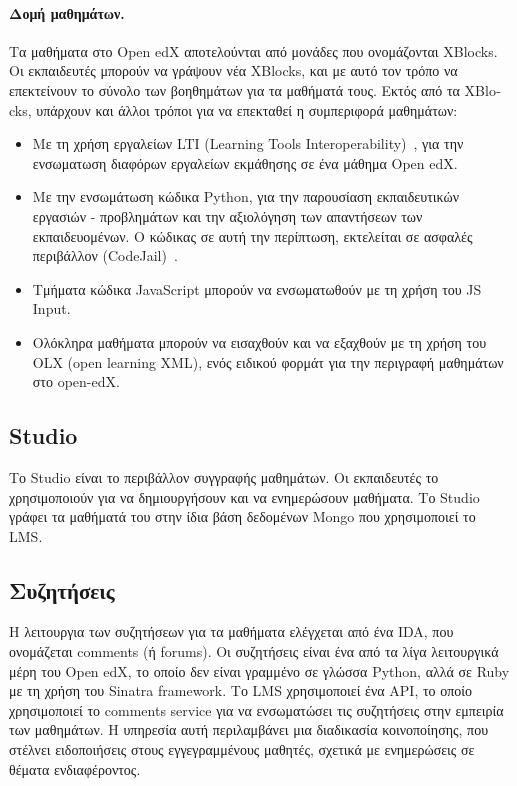 \documentclass[12pt]{report}
\begin{document}
 \paragraph{Δομή μαθημάτων.} Τα μαθήματα στο \textlatin{Open edX} αποτελούνται από μονάδες που ονομάζονται \textlatin{XBlocks}. Οι εκπαιδευτές μπορούν να γράψουν νέα \textlatin{XBlocks}, και με αυτό τον τρόπο να επεκτείνουν το σύνολο των βοηθημάτων για τα μαθήματά τους. Εκτός από τα \textlatin{XBlocks}, υπάρχουν και άλλοι τρόποι για να επεκταθεί η συμπεριφορά μαθημάτων:
\begin{itemize}
  \item Με τη χρήση εργαλείων \textlatin{LTI (Learning Tools Interoperability)}~\cite{lti}, για την ενσωματωση διαφόρων εργαλείων εκμάθησης σε ένα μάθημα \textlatin{Open edX}.
  \item Με την ενσωμάτωση κώδικα \textlatin{Python}, για την παρουσίαση εκπαιδευτικών εργασιών - προβλημάτων και την αξιολόγηση των απαντήσεων των εκπαιδευομένων. Ο κώδικας σε αυτή την περίπτωση, εκτελείται σε ασφαλές περιβάλλον (\textlatin{CodeJail})~\cite{edx_arch}.
  \item Τμήματα κώδικα \textlatin{JavaScript} μπορούν να ενσωματωθούν με τη χρήση του \textlatin{JS Input}.
  \item Ολόκληρα μαθήματα μπορούν να εισαχθούν και να εξαχθούν με τη χρήση του \textlatin{OLX (open learning XML)}, ενός ειδικού φορμάτ για την περιγραφή μαθημάτων στο \textlatin{open-edX}.
\end{itemize}

\subsection{\textlatin{Studio}}
Το \textlatin{Studio} είναι το περιβάλλον συγγραφής μαθημάτων. Οι εκπαιδευτές το χρησιμοποιούν για να δημιουργήσουν και να ενημερώσουν μαθήματα. Το \textlatin{Studio} γράφει τα μαθήματά του στην ίδια βάση δεδομένων \textlatin{Mongo} που χρησιμοποιεί το \textlatin{LMS}.

\subsection{Συζητήσεις}
H λειτουργια των συζητήσεων για τα μαθήματα ελέγχεται από ένα \textlatin{IDA}, που ονομάζεται \textlatin{comments} (ή \textlatin{forums}). Οι συζητήσεις είναι ένα από τα λίγα λειτουργικά μέρη του \textlatin{Open edX}, το οποίο δεν είναι γραμμένο σε γλώσσα \textlatin{Python}, αλλά σε \textlatin{Ruby} με τη χρήση του \textlatin{Sinatra framework}. Το \textlatin{LMS} χρησιμοποιεί ένα \textlatin{API}, το οποίο χρησιμοποιεί το \textlatin{comments service} για να ενσωματώσει τις συζητήσεις στην εμπειρία των μαθημάτων. Η υπηρεσία αυτή περιλαμβάνει μια διαδικασία κοινοποίησης, που στέλνει ειδοποιήσεις στους εγγεγραμμένους μαθητές, σχετικά με ενημερώσεις σε θέματα ενδιαφέροντος.
\end{document}
